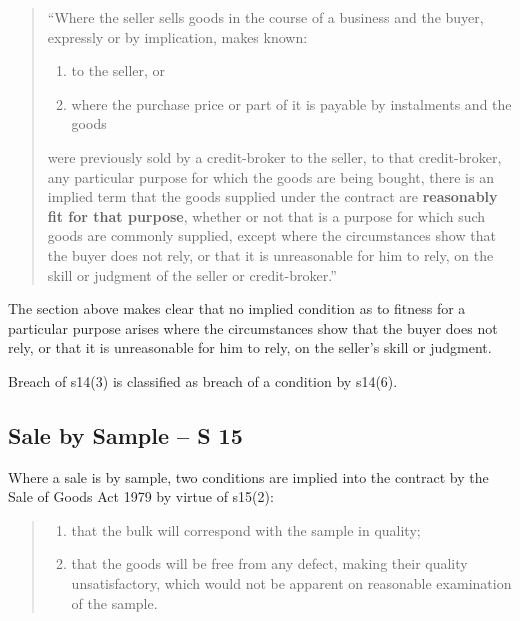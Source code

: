 \documentclass[
]{article}
\providecommand{\tightlist}{%
  \setlength{\itemsep}{0pt}\setlength{\parskip}{0pt}}
\begin{document}
\begin{quote}
``Where the seller sells goods in the course of a business and the
buyer, expressly or by implication, makes known:

\begin{enumerate}
\def\labelenumi{\alph{enumi})}
\tightlist
\item
  to the seller, or\\
\item
  where the purchase price or part of it is payable by instalments and
  the goods
\end{enumerate}

were previously sold by a credit-broker to the seller, to that
credit-broker, any particular purpose for which the goods are being
bought, there is an implied term that the goods supplied under the
contract are \textbf{reasonably fit for that purpose}, whether or not
that is a purpose for which such goods are commonly supplied, except
where the circumstances show that the buyer does not rely, or that it is
unreasonable for him to rely, on the skill or judgment of the seller or
credit-broker.''
\end{quote}

The section above makes clear that no implied condition as to fitness
for a particular purpose arises where the circumstances show that the
buyer does not rely, or that it is unreasonable for him to rely, on the
seller's skill or judgment.

Breach of s14(3) is classified as breach of a condition by s14(6).

\hypertarget{sale-by-sample-s-15}{%
\subsection{Sale by Sample -- S 15}\label{sale-by-sample-s-15}}

Where a sale is by sample, two conditions are implied into the contract
by the Sale of Goods Act 1979 by virtue of s15(2):

\begin{quote}
\begin{enumerate}
\def\labelenumi{(\alph{enumi})}
\tightlist
\item
  that the bulk will correspond with the sample in quality;\\
\item
  that the goods will be free from any defect, making their quality
  unsatisfactory, which would not be apparent on reasonable examination
  of the sample.
\end{enumerate}
\end{quote}
\end{document}
